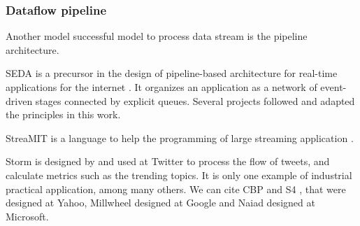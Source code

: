 





\subsubsection{Dataflow pipeline}

Another model successful model to process data stream is the pipeline architecture.

SEDA is a precursor in the design of pipeline-based architecture for real-time applications for the internet \cite{Welsh2001}.
It organizes an application as a network of event-driven stages connected by explicit queues.
Several projects followed and adapted the principles in this work.

StreaMIT is a language to help the programming of large streaming application \cite{Thies2002}.

Storm \cite{Toshniwal2014} is designed by and used at Twitter to process the flow of tweets, and calculate metrics such as the trending topics.
It is only one example of industrial practical application, among many others.
We can cite CBP \cite{Logothetis2010} and S4 \cite{Neumeyer2010}, that were designed at Yahoo, Millwheel \cite{Akidau2013} designed at Google and Naiad \cite{Murray2013} designed at Microsoft.


